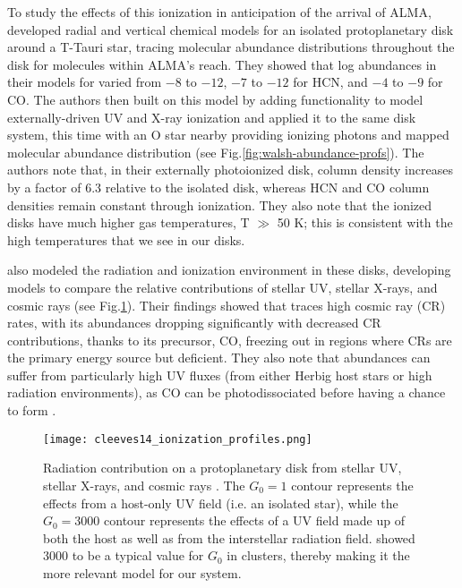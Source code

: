 To study the effects of this ionization in anticipation of the arrival of ALMA, \citet{Walsh2010} developed radial and vertical chemical models for an isolated protoplanetary disk around a T-Tauri star, tracing molecular abundance distributions throughout the disk for molecules within ALMA's reach. They showed that log abundances in their models for \hco varied from $-8$ to $-12$, $-7$ to $-12$ for HCN, and $-4$ to $-9$ for CO. The authors then built on this model by adding functionality to model externally-driven UV and X-ray ionization \citep{Walsh2012} and applied it to the same disk system, this time with an O star nearby providing ionizing photons \citep{Walsh2013} and mapped molecular abundance distribution (see Fig.\ref{fig:walsh-abundance-profs}). The authors note that, in their externally photoionized disk, \hco column density increases by a factor of 6.3 relative to the isolated disk, whereas HCN and CO column densities remain constant through ionization. They also note that the ionized disks have much higher gas temperatures, T $\gg$ 50 K; this is consistent with the high temperatures that we see in our disks.


\citet{Cleeves2013,Cleeves2014} also modeled the radiation and ionization environment in these disks, developing models to compare the relative contributions of stellar UV, stellar X-rays, and cosmic rays (see Fig.\ref{fig:disk_ionization}). Their findings showed that \hco traces high cosmic ray (CR) rates, with its abundances dropping significantly with decreased CR contributions, thanks to its precursor, CO, freezing out in regions where CRs are the primary energy source but deficient. They also note that \hco abundances can suffer from particularly high UV fluxes (from either Herbig host stars or high radiation environments), as CO can be photodissociated before having a chance to form \hco. %



\begin{figure}[t]
  \texttt{[image: cleeves14\_ionization\_profiles.png]}%
  \caption{Radiation contribution on a protoplanetary disk from stellar UV, stellar X-rays, and cosmic rays \citep{Cleeves2013}. The $G_0 = 1$ contour represents the effects from a host-only UV field (i.e. an isolated star), while the $G_0 = 3000$ contour represents the effects of a UV field made up of both the host as well as from the interstellar radiation field. \cite{Fatuzzo2008} showed 3000 to be a typical value for $G_0$ in clusters, thereby making it the more relevant model for our system.}
  \label{fig:disk_ionization}
\end{figure}



